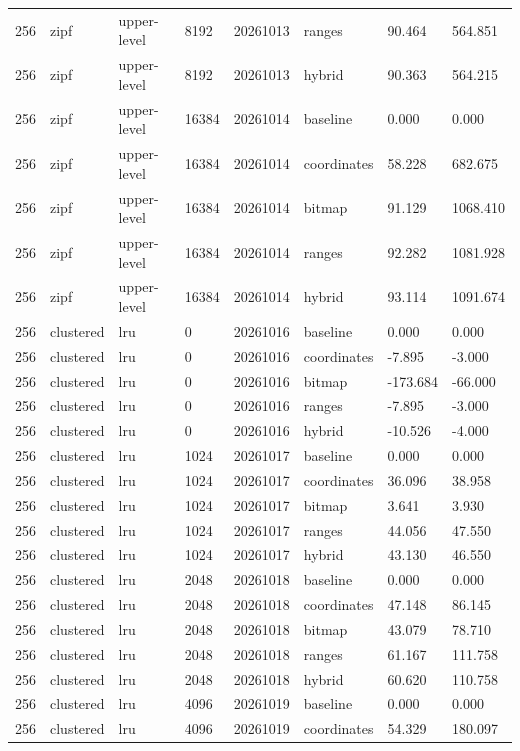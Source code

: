 \begin{tabular}{llllllll}
256 & zipf & upper-level & 8192 & 20261013 & ranges & 90.464 & 564.851 \\
256 & zipf & upper-level & 8192 & 20261013 & hybrid & 90.363 & 564.215 \\
256 & zipf & upper-level & 16384 & 20261014 & baseline & 0.000 & 0.000 \\
256 & zipf & upper-level & 16384 & 20261014 & coordinates & 58.228 & 682.675 \\
256 & zipf & upper-level & 16384 & 20261014 & bitmap & 91.129 & 1068.410 \\
256 & zipf & upper-level & 16384 & 20261014 & ranges & 92.282 & 1081.928 \\
256 & zipf & upper-level & 16384 & 20261014 & hybrid & 93.114 & 1091.674 \\
256 & clustered & lru & 0 & 20261016 & baseline & 0.000 & 0.000 \\
256 & clustered & lru & 0 & 20261016 & coordinates & -7.895 & -3.000 \\
256 & clustered & lru & 0 & 20261016 & bitmap & -173.684 & -66.000 \\
256 & clustered & lru & 0 & 20261016 & ranges & -7.895 & -3.000 \\
256 & clustered & lru & 0 & 20261016 & hybrid & -10.526 & -4.000 \\
256 & clustered & lru & 1024 & 20261017 & baseline & 0.000 & 0.000 \\
256 & clustered & lru & 1024 & 20261017 & coordinates & 36.096 & 38.958 \\
256 & clustered & lru & 1024 & 20261017 & bitmap & 3.641 & 3.930 \\
256 & clustered & lru & 1024 & 20261017 & ranges & 44.056 & 47.550 \\
256 & clustered & lru & 1024 & 20261017 & hybrid & 43.130 & 46.550 \\
256 & clustered & lru & 2048 & 20261018 & baseline & 0.000 & 0.000 \\
256 & clustered & lru & 2048 & 20261018 & coordinates & 47.148 & 86.145 \\
256 & clustered & lru & 2048 & 20261018 & bitmap & 43.079 & 78.710 \\
256 & clustered & lru & 2048 & 20261018 & ranges & 61.167 & 111.758 \\
256 & clustered & lru & 2048 & 20261018 & hybrid & 60.620 & 110.758 \\
256 & clustered & lru & 4096 & 20261019 & baseline & 0.000 & 0.000 \\
256 & clustered & lru & 4096 & 20261019 & coordinates & 54.329 & 180.097 \\

\end{tabular}
